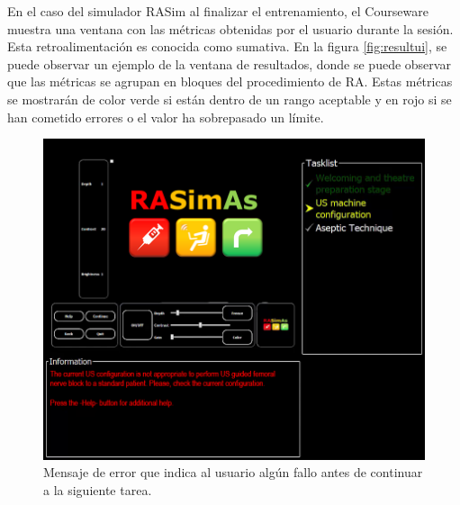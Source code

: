 En el caso del simulador \ac{RASim} al finalizar el entrenamiento, el \ac{Courseware} muestra una ventana con las métricas obtenidas por el usuario durante la sesión. Esta retroalimentación es conocida como sumativa. En la figura \ref{fig:resultui}, se puede observar un ejemplo de la ventana de resultados, donde se puede observar que las métricas se agrupan en bloques del procedimiento de \ac{RA}. Estas métricas se mostrarán de color verde si están dentro de un rango aceptable y en rojo si se han cometido errores o el valor ha sobrepasado un límite.

\begin{figure}[h]
    \centering
    \includegraphics[width=\textwidth]{IMG/errorruntime.png}
    \caption{Mensaje de error que indica al usuario algún fallo antes de continuar a la siguiente tarea.}
    \label{fig:errorrun}
\end{figure}

